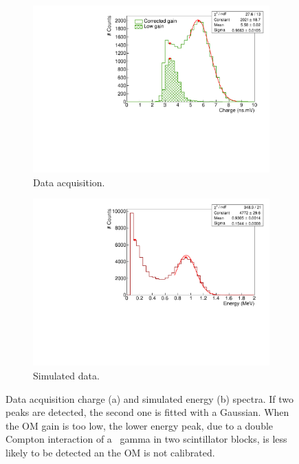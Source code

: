 \begin{figure}[h]
  \centering
  \begin{subfigure}[t]{0.8\textwidth}
    \centering
    \includegraphics[width=1\textwidth]{CobaltStudy/fig_CobaltStudy/ex_charge_distrib.pdf}
    \captionsetup{justification=justified}
    \caption{Data acquisition.
      \label{subfig:Co_calib_charge}}
  \end{subfigure}
  \hfill
  \begin{subfigure}[t]{0.8\textwidth}
  \centering
  \includegraphics[width=1\textwidth]{CobaltStudy/fig_CobaltStudy/ex_energy_distrib.pdf}
    \captionsetup{justification=justified}
  \caption{Simulated data.
    \label{subfig:Co_calib_energy}}
  \end{subfigure}
  \caption{Data acquisition charge (a) and simulated energy (b) spectra.
    If two peaks are detected, the second one is fitted with a Gaussian.
    When the OM gain is too low, the lower energy peak, due to a double Compton interaction of a \Co\ gamma in two scintillator blocks, is less likely to be detected an the OM is not calibrated.
    \label{fig:Co_calib}}
\end{figure}

